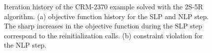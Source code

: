 \begin{figure}
    \centering
    \bigskip
    \caption{Iteration history of the CRM-2370 example solved with the 2S-5R algorithm. (a) objective function history for the SLP and NLP step. The sharp increases in the objective function during the SLP step correspond to the reinitialization calls. (b) constraint violation for the NLP step.}
    \label{fig:07_c3}
\end{figure}

\FloatBarrier
